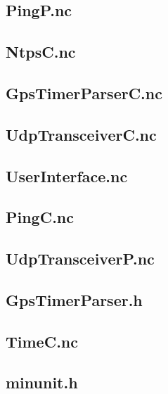 \documentclass[12pt,a4paper,titlepage,oneside]{article}
\begin{document}
{\subsection{PingP.nc}


\subsection{NtpsC.nc}


\subsection{GpsTimerParserC.nc}


\subsection{UdpTransceiverC.nc}


\subsection{UserInterface.nc}


\subsection{PingC.nc}


\subsection{UdpTransceiverP.nc}


\subsection{GpsTimerParser.h}


\subsection{TimeC.nc}


\subsection{minunit.h}


}
\end{document}

